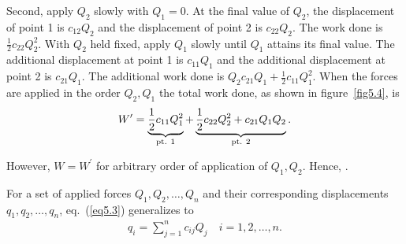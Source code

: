 \documentclass{AeroStructure-ERJohnson}
\begin{document}

Second, apply $Q_{2}$ slowly with $ Q_{1}=0 $. At the final value of $Q_{2}$, the displacement of point 1 is $ c_{12} Q_{2} $ and the displacement of point 2 is $ c_{22} Q_{2} $. The work done is $ \frac{1}{2} c_{22} Q_{2}^{2} $. With $Q_{2}$ held fixed, apply $Q_{1}$ slowly until $Q_{1}$ attains its final value. The additional displacement at point 1 is $ c_{11} Q_{1} $ and the additional displacement at point 2 is $ c_{21} Q_{1} $. The additional work done is $ Q_{2} c_{21} Q_{1}+\frac{1}{2} c_{11} Q_{1}^{2} $. When the forces are applied in the order $ Q_{2}, Q_{1} $ the total work done, as shown in figure~\ref{fig5.4}, is
\begin{align*}
W^{\prime}=\underbrace{\frac{1}{2} c_{11} Q_{1}^{2}}_{{\rm pt.\ } 1}+\underbrace{\frac{1}{2} c_{22} Q_{2}^{2}+c_{21} Q_{1} Q_{2}}_{\rm {pt.\ } 2}.
\end{align*}


\pagebreak

\noindent However, $W=W^{\prime}$ for arbitrary order of application of $Q_{1},Q_{2}$. Hence, .

For a set of applied forces $Q_{1}, Q_{2}, \ldots, Q_{n}$ and their corresponding displacements $ q_{1}, q_{2}, \ldots, q_{n} $, eq.~(\ref{eq5.3}) generalizes\vspace*{-6pt} to
\begin{align}\label{eq5.6}
q_{i}=\sum_{j=1}^{n} c_{i j} Q_{j} \quad i=1,2, \ldots, n.
\end{align}
\end{document}
